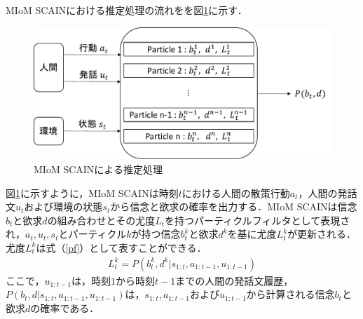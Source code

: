 \par
MIoM SCAINにおける推定処理の流れをを図\ref{fig:sys_arc}に示す．
\begin{figure}[htbp]
  \begin{center}
    \includegraphics[scale=0.7]{./bt1.pdf}
    \caption{MIoM SCAINによる推定処理}
    \label{fig:sys_arc}
  \end{center}
\end{figure}
図\ref{fig:sys_arc}に示すように，MIoM SCAINは時刻$t$における人間の散策行動$a_t$，人間の発話文$u_t$および環境の状態$s_t$から信念と欲求の確率を出力する．MIoM SCAINは信念$b_t$と欲求$d$の組み合わせとその尤度$L_t$を持つパーティクルフィルタとして表現され，$a_t,u_t,s_t$とパーティクル$k$が持つ信念$b_t^k$と欲求$d^k$を基に尤度$L^k_t$が更新される．尤度$L^k_t$は式（\ref{pf}）として表すことができる．
\begin{equation}
  \begin{split}
  \label{pf}
  L^k_t=P(b_t^k,d^k|s_{1:t},a_{1:t-1},u_{1:t-1})
  \end{split}
\end{equation}
ここで，$u_{1:t-1}$は，時刻$1$から時刻$t-1$までの人間の発話文履歴，$P(b_t,d|s_{1:t},a_{1:t-1},u_{1:t-1})$は，$s_{1:t},a_{1:t-1}およびu_{1:t-1}$から計算される信念$b_t$と欲求$d$の確率である．

